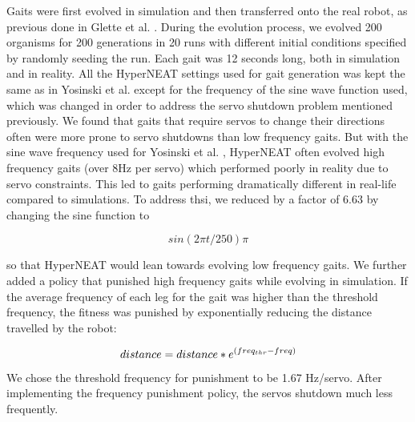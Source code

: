 Gaits were first evolved in simulation and then transferred onto the real robot, as previous done in Glette et al. \cite{glette}. 
During the evolution process, we evolved 200 organisms for 200 generations in 20 runs with different initial conditions specified by randomly seeding the run. 
Each gait was 12 seconds long, both in simulation and in reality. 
All the HyperNEAT settings used for gait generation was kept the same as in Yosinski et al. \cite{yos:clune} except for the frequency of the sine wave function used, which was changed in order to address the servo shutdown problem mentioned previously. 
We found that gaits that require servos to change their directions often were more prone to servo shutdowns than low frequency gaits. %
But with the sine wave frequency used for Yosinski et al. \cite{yos:clune}, HyperNEAT often evolved high frequency gaits (over 8Hz per servo) which performed poorly in reality due to servo constraints. 
This led to gaits performing dramatically different in real-life compared to simulations. 
To address thsi, we reduced by a factor of 6.63 by changing the sine function to

\begin{equation}
sin(2\pi t/250)\pi
\end{equation}

%
%

so that HyperNEAT would lean towards evolving low frequency gaits. %
We further added a policy that punished high frequency gaits while evolving in simulation. 
If the average frequency of each leg for the gait was higher than the threshold frequency, the fitness was punished by exponentially reducing the distance travelled by the robot:

\begin{equation}
distance = distance*e^{(freq_{thr}-freq)} \\
\end{equation}

We chose the threshold frequency for punishment to be 1.67 Hz/servo. 
After implementing the frequency punishment policy, the servos shutdown much less frequently. 


